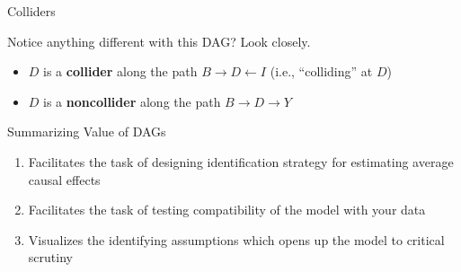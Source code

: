 \documentclass{beamer}
\begin{document}
\begin{frame}{Colliders}

  \begin{center}
  \end{center}

  \bigskip

  Notice anything different with this DAG?  Look closely.
  \begin{itemize}

    \item $D$ is a \textbf{collider} along the path $B\rightarrow D\leftarrow I$ (i.e., ``colliding'' at $D$)
    \item $D$ is a \textbf{noncollider} along the path $B\rightarrow D\rightarrow Y$

  \end{itemize}

\end{frame}


\begin{frame}{Summarizing Value of DAGs}

  \begin{enumerate}
    \item Facilitates the task of designing identification strategy for estimating average causal effects
    \item Facilitates the task of testing compatibility of the model with your data
    \item Visualizes the identifying assumptions which opens up the model to critical scrutiny
  \end{enumerate}

\end{frame}
\end{document}
